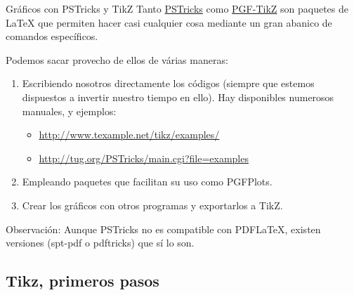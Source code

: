 \documentclass[10pt]{beamer}
\begin{document}
\begin{frame}[fragile]{Gr\'aficos con PSTricks y TikZ}
Tanto \href{http://www.ctan.org/pkg/pstricks}{\color{blue}PSTricks} como \href{http://www.texample.net/tikz/}{\color{blue}PGF-TikZ} son paquetes de LaTeX que permiten hacer casi cualquier cosa mediante un gran abanico de comandos espec\'ificos.

Podemos sacar provecho de ellos de v\'arias maneras:
\begin{enumerate}
\item Escribiendo nosotros directamente los c\'odigos (siempre que estemos dispuestos a invertir nuestro tiempo en ello). Hay disponibles numerosos manuales, y ejemplos:
\begin{itemize}
\item \href{http://www.texample.net/tikz/examples/}{\color{blue}http://www.texample.net/tikz/examples/}
\item \href{http://tug.org/PSTricks/main.cgi?file=examples}{\color{blue}http://tug.org/PSTricks/main.cgi?file=examples}
\end{itemize}
\item Empleando paquetes que facilitan su uso como PGFPlots.
\item Crear los gr\'aficos con otros programas y exportarlos a TikZ.
\end{enumerate}


\vspace{0.5cm}
{\small Observaci\'on:
Aunque PSTricks no es compatible con PDFLaTeX, existen versiones (spt-pdf o pdftricks)
que sí lo son.}
\end{frame}

\subsection{Tikz, primeros pasos}
\end{document}
